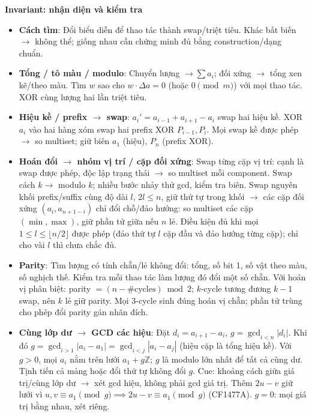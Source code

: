 \noindent\textbf{Invariant: nhận diện và kiểm tra}
\begin{itemize}
    \setlength{\itemsep}{0pt}
    \setlength{\parsep}{0pt}
    \item \textbf{Cách tìm}: Đổi biểu diễn để thao tác thành swap/triệt tiêu. Khác bất biến $\to$ không thể; giống nhau cần chứng minh đủ bằng construction/dạng chuẩn.
    \item \textbf{Tổng / tô màu / modulo}: Chuyển lượng $\to\sum a_i$; đối xứng $\to$ tổng xen kẽ/theo màu. Tìm $w$ sao cho $w\cdot\Delta a=0$ (hoặc $0\pmod m$) với mọi thao tác. XOR cùng lượng hai lần triệt tiêu.
    \item \textbf{Hiệu kề / prefix $\to$ swap}: $a_i'=a_{i-1}+a_{i+1}-a_i$ swap hai hiệu kề. XOR $a_i$ vào hai hàng xóm swap hai prefix XOR $P_{i-1},P_i$. Mọi swap kề được phép $\to$ so multiset; giữ biên $a_1$ (hiệu), $P_n$ (prefix XOR).
    \item \textbf{Hoán đổi $\to$ nhóm vị trí / cặp đối xứng}: Swap từng cặp vị trí: cạnh là swap được phép, độc lập trạng thái $\to$ so multiset mỗi component. Swap cách $k\to$ modulo $k$; nhiều bước nhảy thử gcd, kiểm tra biên. Swap nguyên khối prefix/suffix cùng độ dài $l$, $2l\le n$, giữ thứ tự trong khối $\to$ các cặp đối xứng $(a_i,a_{n+1-i})$ chỉ đổi chỗ/đảo hướng: so multiset các cặp $(\min,\max)$, giữ phần tử giữa nếu $n$ lẻ. Điều kiện đủ khi mọi $1\le l\le\lfloor n/2\rfloor$ được phép (đảo thứ tự $l$ cặp đầu và đảo hướng từng cặp); chỉ cho vài $l$ thì chưa chắc đủ.
    \item \textbf{Parity}: Tìm lượng có tính chẵn/lẻ không đổi: tổng, số bit 1, số vật theo màu, số nghịch thế. Kiểm tra mỗi thao tác làm lượng đó đổi một số chẵn. Với hoán vị phân biệt: parity $=(n-\#\text{cycles})\bmod2$; $k$-cycle tương đương $k-1$ swap, nên $k$ lẻ giữ parity. Mọi 3-cycle sinh đúng hoán vị chẵn; phần tử trùng cho phép đổi parity gán nhãn đích.
    \item \textbf{Cùng lớp dư $\to$ GCD các hiệu}: Đặt $d_i=a_{i+1}-a_i$, $g=\gcd_{i<n}|d_i|$. Khi đó $g=\gcd_{i>1}|a_i-a_1|=\gcd_{i<j}|a_i-a_j|$ (hiệu cặp là tổng hiệu kề). Với $g>0$, mọi $a_i$ nằm trên lưới $a_1+g\mathbb Z$; $g$ là modulo lớn nhất để tất cả cùng dư. Tịnh tiến cả mảng hoặc đổi thứ tự không đổi $g$. Cue: khoảng cách giữa giá trị/cùng lớp dư $\to$ xét gcd hiệu, không phải gcd giá trị. Thêm $2u-v$ giữ lưới vì $u,v\equiv a_1\pmod g\implies2u-v\equiv a_1\pmod g$ (CF1477A). $g=0$: mọi giá trị bằng nhau, xét riêng.
\end{itemize}

